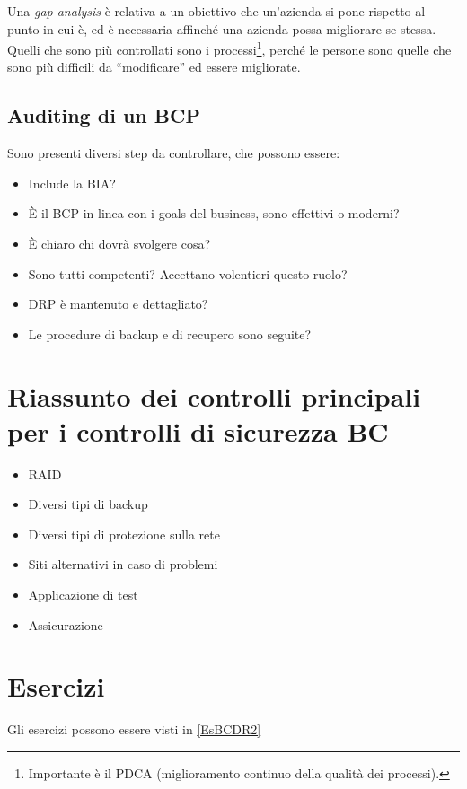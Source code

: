Una \textit{gap analysis} è relativa a un obiettivo che un'azienda si pone 
rispetto al punto in cui è, ed è necessaria affinché una azienda possa 
migliorare se stessa. Quelli che sono più controllati sono i 
processi\footnote{Importante è il PDCA (miglioramento continuo della qualità 
dei processi).}, perché le persone sono quelle che sono più difficili da 
``modificare'' ed essere migliorate.

\subsection{Auditing di un BCP}

Sono presenti diversi step da controllare, che possono essere:
\begin{itemize}
  \item Include la BIA?
  \item È il BCP in linea con i goals del business, sono effettivi o moderni?
  \item È chiaro chi dovrà svolgere cosa?
  \item Sono tutti competenti? Accettano volentieri questo ruolo?
  \item DRP è mantenuto e dettagliato?
  \item Le procedure di backup e di recupero sono seguite?
\end{itemize}


\section{Riassunto dei controlli principali per i controlli di sicurezza BC}

\begin{itemize}
  \item RAID
  \item Diversi tipi di backup
  \item Diversi tipi di protezione sulla rete
  \item Siti alternativi in caso di problemi
  \item Applicazione di test
  \item Assicurazione
\end{itemize}

\section{Esercizi}

Gli esercizi possono essere visti in \ref{EsBCDR2}